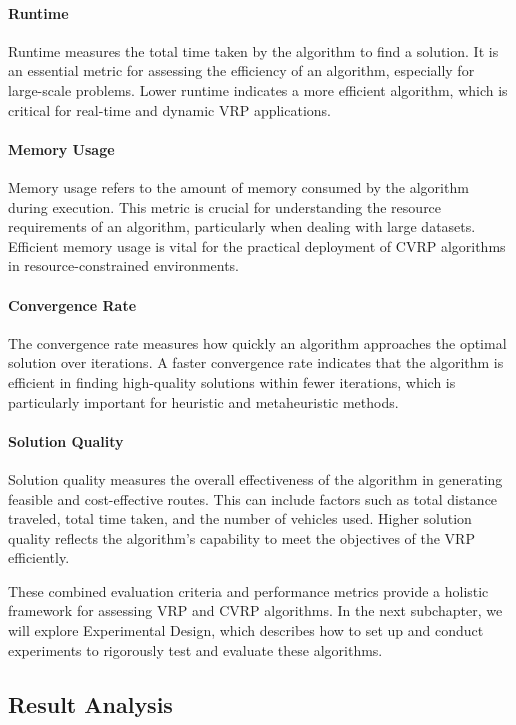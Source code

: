 \documentclass{article}
\begin{document}
    \paragraph{Runtime} Runtime measures the total time taken by the algorithm to find a solution. It is an essential metric for assessing the efficiency of an algorithm, especially for large-scale problems. Lower runtime indicates a more efficient algorithm, which is critical for real-time and dynamic VRP applications.

    \paragraph{Memory Usage} Memory usage refers to the amount of memory consumed by the algorithm during execution. This metric is crucial for understanding the resource requirements of an algorithm, particularly when dealing with large datasets. Efficient memory usage is vital for the practical deployment of CVRP algorithms in resource-constrained environments.

    \paragraph{Convergence Rate} The convergence rate measures how quickly an algorithm approaches the optimal solution over iterations. A faster convergence rate indicates that the algorithm is efficient in finding high-quality solutions within fewer iterations, which is particularly important for heuristic and metaheuristic methods.

    \paragraph{Solution Quality} Solution quality measures the overall effectiveness of the algorithm in generating feasible and cost-effective routes. This can include factors such as total distance traveled, total time taken, and the number of vehicles used. Higher solution quality reflects the algorithm’s capability to meet the objectives of the VRP efficiently.


    These combined evaluation criteria and performance metrics provide a holistic framework for assessing VRP and CVRP algorithms. In the next subchapter, we will explore Experimental Design, which describes how to set up and conduct experiments to rigorously test and evaluate these algorithms. \cite{staegemann2024}

    \subsection{Result Analysis}\label{subsec:result-analysis}
\end{document}
